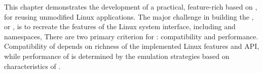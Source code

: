 This chapter
demonstrates the development of a practical, feature-rich \libos{} based on
\thehostabi{},
for reusing unmodified Linux applications.
The major challenge in building the \libos{},
or \thelibos{},
is to recreate the features of the Linux system interface, including
\linuxapis{} and namespaces, %
There are two
primary criterion for \thelibos{}:
compatibility and performance.
Compatibility of \thelibos{} depends on
richness of the implemented Linux features and API,
while performance of \thelibos{} is determined
by the emulation strategies
based on characteristics of \thehostabi{}.





